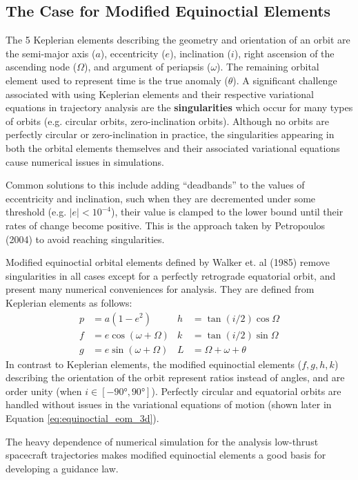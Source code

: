 \subsection{The Case for Modified Equinoctial Elements}
The 5 Keplerian elements describing the geometry and orientation of an orbit are the semi-major axis ($a$), eccentricity ($e$), inclination ($i$), right ascension of the ascending node ($\Omega$), and argument of periapsis ($\omega$). The remaining orbital element used to represent time is the true anomaly ($\theta$). A significant challenge associated with using Keplerian elements and their respective variational equations in trajectory analysis are the \textbf{singularities} which occur for many types of orbits (e.g. circular orbits, zero-inclination orbits). Although no orbits are perfectly circular or zero-inclination in practice, the singularities appearing in both the orbital elements themselves and their associated variational equations cause numerical issues in simulations. 

Common solutions to this include adding ``deadbands'' to the values of eccentricity and inclination, such when they are decremented under some threshold (e.g. $|e| < 10^{-4}$), their value is clamped to the lower bound until their rates of change become positive. This is the approach taken by Petropoulos (2004) \cite{petropoulos2004low} to avoid reaching singularities.

Modified equinoctial orbital elements defined by Walker et. al (1985) \cite{walker1985set} remove singularities in all cases except for a perfectly retrograde equatorial orbit, and present many numerical conveniences for analysis. They are defined from Keplerian elements as follows:
\begin{align*}
    p &= a \left(1-e^2\right) & h &= \tan(i/2) \cos \Omega\\
    f &= e \cos(\omega + \Omega) &  k &= \tan(i/2) \sin \Omega\\
    g &= e \sin(\omega + \Omega) & L &= \Omega + \omega + \theta
\end{align*}
In contrast to Keplerian elements, the modified equinoctial elements ($f, g, h, k$) describing the orientation of the orbit represent ratios instead of angles, and are order unity (when $i \in [-\ang{90}, \ang{90}]$). Perfectly circular and equatorial orbits are handled without issues in the variational equations of motion (shown later in Equation \ref{eq:equinoctial_eom_3d}).

The heavy dependence of numerical simulation for the analysis low-thrust spacecraft trajectories makes modified equinoctial elements a good basis for developing a guidance law.

